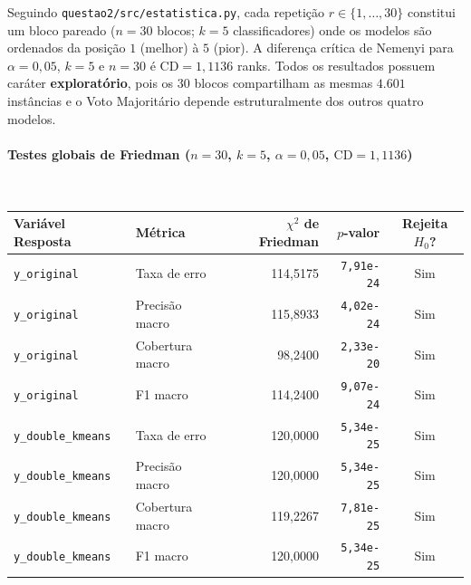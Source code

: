\documentclass[a4paper,11pt]{article}
\begin{document}
Seguindo \texttt{questao2/\allowbreak src/\allowbreak estatistica.py}, cada repetição $r \in \{1, \ldots, 30\}$ constitui um bloco pareado ($n = 30$ blocos; $k = 5$ classificadores) onde os modelos são ordenados da posição $1$ (melhor) à $5$ (pior). A diferença crítica de Nemenyi para $\alpha = 0,05$, $k = 5$ e $n = 30$ é \textbf{$\text{CD} = 1,1136$} ranks. Todos os resultados possuem caráter \textbf{exploratório}, pois os $30$ blocos compartilham as mesmas $4.601$ instâncias e o Voto Majoritário depende estruturalmente dos outros quatro modelos.

\paragraph{\texorpdfstring{Testes globais de Friedman ($n = 30$, $k = 5$, $\alpha = 0,05$, $\text{CD} = 1,1136$)}{Testes globais de Friedman (n = 30, k = 5, alpha = 0,05, textCD = 1,1136)}}\mbox{}\\[-0.2em]\label{sec:testes-globais-de-friedman-n-30-k-5-alpha-0-05-textcd-1-1136}


\begin{center}
\begin{minipage}{\linewidth}
\centering
{}
\small
\setlength{\tabcolsep}{5pt}
\renewcommand{\arraystretch}{1.18}
\begin{tabular}{l l r r c}
\toprule
\textbf{Variável Resposta} & \textbf{Métrica} & \textbf{$\chi^2$ de Friedman} & \textbf{$p$-valor} & \textbf{Rejeita $H_0$?} \\
\midrule
\texttt{y\_\allowbreak original} & Taxa de erro & 114,5175 & \texttt{7,\allowbreak 91e-24} & Sim \\
\texttt{y\_\allowbreak original} & Precisão macro & 115,8933 & \texttt{4,\allowbreak 02e-24} & Sim \\
\texttt{y\_\allowbreak original} & Cobertura macro & 98,2400 & \texttt{2,\allowbreak 33e-20} & Sim \\
\texttt{y\_\allowbreak original} & F1 macro & 114,2400 & \texttt{9,\allowbreak 07e-24} & Sim \\
\texttt{y\_\allowbreak double\_\allowbreak kmeans} & Taxa de erro & 120,0000 & \texttt{5,\allowbreak 34e-25} & Sim \\
\texttt{y\_\allowbreak double\_\allowbreak kmeans} & Precisão macro & 120,0000 & \texttt{5,\allowbreak 34e-25} & Sim \\
\texttt{y\_\allowbreak double\_\allowbreak kmeans} & Cobertura macro & 119,2267 & \texttt{7,\allowbreak 81e-25} & Sim \\
\texttt{y\_\allowbreak double\_\allowbreak kmeans} & F1 macro & 120,0000 & \texttt{5,\allowbreak 34e-25} & Sim \\
\bottomrule
\end{tabular}
\end{minipage}
\end{center}
\end{document}
